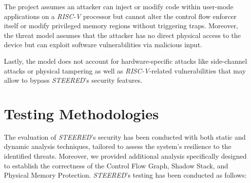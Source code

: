The project assumes an attacker can inject or modify code within user-mode
applications on a \textit{RISC-V} processor but cannot alter the control flow enforcer
itself or modify privileged memory regions without triggering traps. Moreover, the
threat model assumes that the attacker has no direct physical access to the device
but can exploit software vulnerabilities via malicious input.

Lastly, the model does not account for hardware-specific attacks like side-channel
attacks or physical tampering as well as \textit{RISC-V}-related vulnerabilities
that may allow to bypass \textit{STEERED}'s security features.

\section{Testing Methodologies}
\label{sec:ta_methodologies}

The evaluation of \textit{STEERED}'s security has been conducted with both
static and dynamic analysis techniques, tailored to assess the system's resilience
to the identified threats. Moreover, we provided additional analysis specifically
designed to establish the correctness of the Control Flow Graph, Shadow Stack, and
Physical Memory Protection. \textit{STEERED}'s testing has been conducted as follows:

